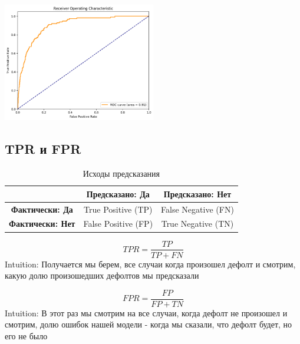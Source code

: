 \documentclass{article}
\begin{document}
        \begin{center}
            \includegraphics[width=0.5\textwidth]{photos/roc.png}
        \end{center}



        \subsection{TPR и FPR}
            \begin{table}[h] %
                \centering %
                \caption{Исходы предсказания} %
                \begin{tabular}{|c|c|c|}
                    \hline
                    & \textbf{Предсказано: Да} & \textbf{Предсказано: Нет} \\ \hline
                    \textbf{Фактически: Да} & True Positive (TP) & False Negative (FN) \\ \hline
                    \textbf{Фактически: Нет} & False Positive (FP) & True Negative (TN) \\ \hline
                \end{tabular}
            \end{table}
    
            \begin{equation}
                TPR = \dfrac{TP}{TP + FN}
            \end{equation}
            Intuition: Получается мы берем, все случаи когда произошел дефолт и смотрим, какую
            долю произошедших дефолтов мы предсказали
    
            \begin{equation}
                FPR = \dfrac{FP}{FP + TN}
            \end{equation}
            Intuition: В этот раз мы смотрим на все случаи, когда дефолт не произошел и смотрим, долю ошибок нашей
            модели - когда мы сказали, что дефолт будет, но его не было
    
\end{document}
